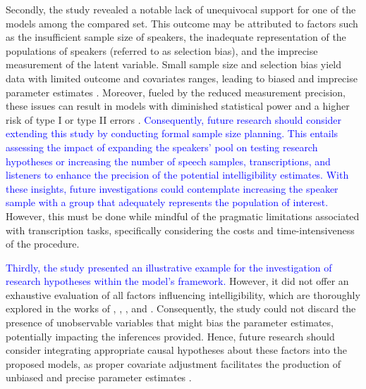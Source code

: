 \documentclass[
  authoryear,
  preprint,
  1p]{elsarticle}
\begin{document}
Secondly, the study revealed a notable lack of unequivocal support for
one of the models among the compared set. This outcome may be attributed
to factors such as the insufficient sample size of speakers, the
inadequate representation of the populations of speakers (referred to as
selection bias), and the imprecise measurement of the latent variable.
Small sample size and selection bias yield data with limited outcome and
covariates ranges, leading to biased and imprecise parameter estimates
\citep{Everitt_et_al_2010}. Moreover, fueled by the reduced measurement
precision, these issues can result in models with diminished statistical
power and a higher risk of type I or type II errors
\citep{McElreath_2020}. \textcolor{blue}{Consequently, future research should consider
extending this study by conducting formal sample size planning. This
entails assessing the impact of expanding the speakers' pool on testing
research hypotheses or increasing the number of speech samples,
transcriptions, and listeners to enhance the precision of the potential
intelligibility estimates. With these insights, future investigations
could contemplate increasing the speaker sample with a group that
adequately represents the population of interest.} However, this must be
done while mindful of the pragmatic limitations associated with
transcription tasks, specifically considering the costs and
time-intensiveness of the procedure.

\textcolor{blue}{Thirdly, the study presented an illustrative example for the
investigation of research hypotheses within the model's framework.}
However, it did not offer an exhaustive evaluation of all factors
influencing intelligibility, which are thoroughly explored in the works
of \citet{Niparko_et_al_2010}, \citet{Boons_et_al_2012},
\citet{Gillis_2018}, and \citet{Fagan_et_al_2020}. Consequently, the
study could not discard the presence of unobservable variables that
might bias the parameter estimates, potentially impacting the inferences
provided. Hence, future research should consider integrating appropriate
causal hypotheses about these factors into the proposed models, as
proper covariate adjustment facilitates the production of unbiased and
precise parameter estimates
\citep{Cinelli_et_al_2021, Deffner_et_al_2022}.
\end{document}

